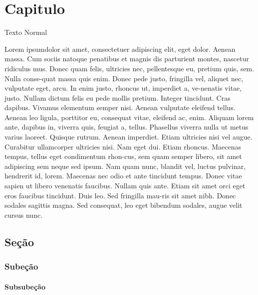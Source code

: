 \documentclass{ufsc-thesis}
\begin{document}
\chapter{Capitulo \\ \showfont}

Texto Normal

\showfont

Lorem ipsumdolor sit amet, consectetuer adipiscing elit, eget
dolor. Aenean massa. Cum sociis natoque penatibus et magnis
dis parturient montes, nascetur ridiculus mus. Donec quam felis,
ultricies nec, pellentesque eu, pretium quis, sem.
Nulla conse-quat massa quis enim. Donec pede justo, fringilla vel, aliquet nec,
vulputate eget, arcu. In enim justo, rhoncus ut, imperdiet a, ve-nenatis vitae, justo. Nullam dictum felis eu pede mollis pretium.
Integer tincidunt. Cras dapibus. Vivamus elementum semper nisi.
Aenean vulputate eleifend tellus. Aenean leo ligula, porttitor eu,
consequat vitae, eleifend ac, enim. Aliquam lorem ante, dapibus
in, viverra quis, feugiat a, tellus. Phasellus viverra nulla ut metus
varius laoreet. Quisque rutrum. Aenean imperdiet. Etiam ultricies
nisi vel augue. Curabitur ullamcorper ultricies nisi. Nam eget dui.
Etiam rhoncus. Maecenas tempus, tellus eget condimentum rhon-cus, sem quam semper libero, sit amet adipiscing sem neque sed
ipsum. Nam quam nunc, blandit vel, luctus pulvinar, hendrerit id,
lorem. Maecenas nec odio et ante tincidunt tempus. Donec vitae
sapien ut libero venenatis faucibus. Nullam quis ante. Etiam sit
amet orci eget eros faucibus tincidunt. Duis leo. Sed fringilla mau-ris sit amet nibh. Donec sodales sagittis magna. Sed consequat,
leo eget bibendum sodales, augue velit cursus nunc. 

\section{Seção \\ \showfont}

\subsection{Subeção \\ \showfont}

\subsubsection{Subsubeção \\ \showfont}
\end{document}
